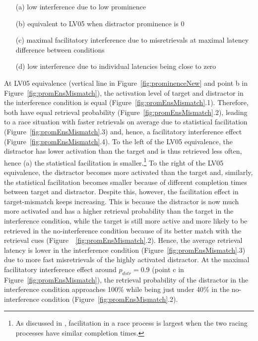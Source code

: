 \documentclass{cambridge7A}\usepackage[]{graphicx}\usepackage[]{color}
\begin{document}
\begin{enumerate}
	\item[(a)] low interference due to low prominence
 	\item[(b)] equivalent to LV05 when distractor prominence is $0$
 	\item[(c)] maximal facilitatory interference due to misretrievals at maximal latency difference between conditions
 	\item[(d)] low interference due to individual latencies being close to zero
\end{enumerate}

At LV05 equivalence (vertical line in Figure~\ref{fig:prominenceNew} and point b in Figure~\ref{fig:promEnsMismatch}), the activation level of target and distractor in the interference condition is equal (Figure~\ref{fig:promEnsMismatch}.1). Therefore, both have equal retrieval probability (Figure~\ref{fig:promEnsMismatch}.2), leading to a race situation with  faster retrievals on average due to statistical facilitation (Figure~\ref{fig:promEnsMismatch}.3) and, hence, a facilitatory interference effect (Figure~\ref{fig:promEnsMismatch}.4).
To the left of the LV05 equivalence, the distractor has lower activation than the target and is thus retrieved less often, hence (a) the statistical facilitation is smaller.\footnote{
  As discussed in \cite{LogacevVasishth2015}, facilitation in a race process is largest when the two racing processes have similar completion times.} 
To the right of the LV05 equivalence, the distractor becomes more activated than the target and, similarly, the statistical facilitation becomes smaller because of different completion times between target and distractor. Despite this, however, the facilitation effect in target-mismatch keeps increasing. This is because the distractor is now much more activated and has a higher retrieval probability than the target in the  interference condition, while the target is still more active and more likely to be retrieved in the  no-interference condition because of its better match with the retrieval cues (Figure~~\ref{fig:promEnsMismatch}.2). Hence, the average retrieval latency is lower in the interference condition (Figure~\ref{fig:promEnsMismatch}.3) due to more fast  misretrievals of the highly activated distractor. 
At the maximal facilitatory interference effect around $p_{dstr}=0.9$ (point c in Figure~\ref{fig:promEnsMismatch}), the retrieval probability of the distractor in the interference condition approaches 100\% while being just under 40\% in the no-interference condition (Figure~\ref{fig:promEnsMismatch}.2). 
\end{document}
